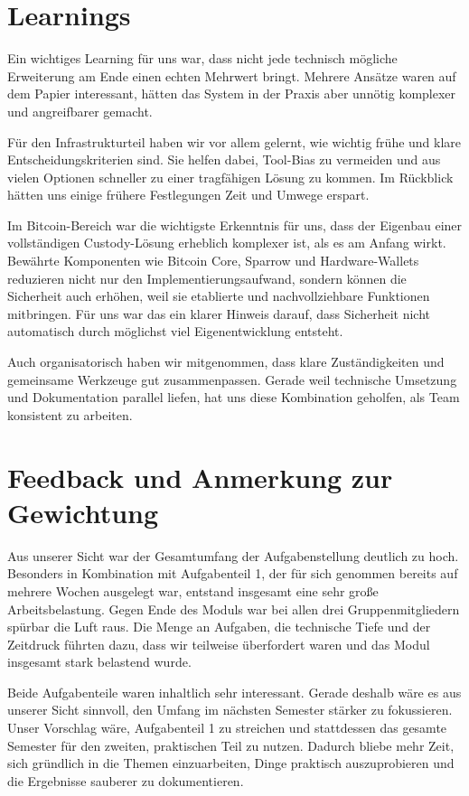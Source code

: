 \section{Learnings}
Ein wichtiges Learning für uns war, dass nicht jede technisch mögliche Erweiterung am Ende einen echten Mehrwert bringt. Mehrere Ansätze waren auf dem Papier interessant, hätten das System in der Praxis aber unnötig komplexer und angreifbarer gemacht.

Für den Infrastrukturteil haben wir vor allem gelernt, wie wichtig frühe und klare Entscheidungskriterien sind. Sie helfen dabei, Tool-Bias zu vermeiden und aus vielen Optionen schneller zu einer tragfähigen Lösung zu kommen. Im Rückblick hätten uns einige frühere Festlegungen Zeit und Umwege erspart.

Im Bitcoin-Bereich war die wichtigste Erkenntnis für uns, dass der Eigenbau einer vollständigen Custody-Lösung erheblich komplexer ist, als es am Anfang wirkt. Bewährte Komponenten wie Bitcoin Core, Sparrow und Hardware-Wallets reduzieren nicht nur den Implementierungsaufwand, sondern können die Sicherheit auch erhöhen, weil sie etablierte und nachvollziehbare Funktionen mitbringen. Für uns war das ein klarer Hinweis darauf, dass Sicherheit nicht automatisch durch möglichst viel Eigenentwicklung entsteht.

Auch organisatorisch haben wir mitgenommen, dass klare Zuständigkeiten und gemeinsame Werkzeuge gut zusammenpassen. Gerade weil technische Umsetzung und Dokumentation parallel liefen, hat uns diese Kombination geholfen, als Team konsistent zu arbeiten.


\section{Feedback und Anmerkung zur Gewichtung}

Aus unserer Sicht war der Gesamtumfang der Aufgabenstellung deutlich zu hoch. Besonders in Kombination mit Aufgabenteil 1, der für sich genommen bereits auf mehrere Wochen ausgelegt war, entstand insgesamt eine sehr große Arbeitsbelastung. Gegen Ende des Moduls war bei allen drei Gruppenmitgliedern spürbar die Luft raus. Die Menge an Aufgaben, die technische Tiefe und der Zeitdruck führten dazu, dass wir teilweise überfordert waren und das Modul insgesamt stark belastend wurde.

Beide Aufgabenteile waren inhaltlich sehr interessant. Gerade deshalb wäre es aus unserer Sicht sinnvoll, den Umfang im nächsten Semester stärker zu fokussieren. Unser Vorschlag wäre, Aufgabenteil 1 zu streichen und stattdessen das gesamte Semester für den zweiten, praktischen Teil zu nutzen. Dadurch bliebe mehr Zeit, sich gründlich in die Themen einzuarbeiten, Dinge praktisch auszuprobieren und die Ergebnisse sauberer zu dokumentieren.

